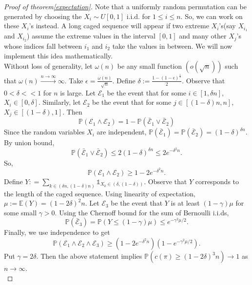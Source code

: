 \documentclass[10pt,a4paper]{amsart}
\begin{document}
\begin{proof}[Proof of theorem\ref{expectation}]
 Note that a uniformly random permutation can be generated by choosing the $X_i \sim U[0,1]$ i.i.d. for $1 \leq i \leq n$. So, we can work on these $X_i$'s instead. A long caged sequence will appear if two extreme $X_i$'s(say $X_{i_1}$ and $X_{i_2} $) assume the extreme values in the interval $[0, 1]$ and many other $X_j$'s whose indices fall between $i_1$ and $i_2$ take the values in between. We will now implement this idea mathematically. \\
 Without loss of generality, let $\omega(n)$ be any small function $\left(o(\sqrt{n})\right)$ such that $\omega(n) \xrightarrow{n \rightarrow \infty } \infty$. Take $\displaystyle\epsilon = \frac{\omega(n)}{\sqrt{n}}$. Define $\delta := \displaystyle \frac{1 - (1 - \epsilon)^{\frac{1}{3}}}{2} $. Observe that $0<\delta < < 1$ for $n$ is large. Let $\mathcal{E}_1 $ be the event that for some $i \in [1, \delta n]$, $X_i \in [0, \delta ]$. Similarly, let $\mathcal{E}_2 $ be the event that for some $j \in [(1 -\delta) n, n]$, $X_j \in [(1 - \delta), 1]$. Then 
 \[
 \mathbb{P}\left( \mathcal{E}_1 \wedge \mathcal{E}_2 \right) = 1 - \mathbb{P}\left( \bar{\mathcal{E}}_1 \vee \bar{\mathcal{E}}_2 \right)
 \] 
 Since the random variables $X_i$ are independent, $ \mathbb{P}\left( \bar{\mathcal{E}}_1 \right) = \mathbb{P} \left( \bar{\mathcal{E}}_2 \right) = (1 - \delta )^{\delta n} $. By union bound,
 \[
 \mathbb{P}\left( \bar{\mathcal{E}}_1 \vee \bar{\mathcal{E}}_2 \right) \leq 2(1 - \delta )^{\delta n} \leq 2e^{-\delta^2 n}.
 \] 
 So, 
 \[
 \mathbb{P}\left( \mathcal{E}_1 \wedge \mathcal{E}_2 \right) \geq 1 -  2e^{-\delta^2 n}.
 \]
 Define $Y : = \displaystyle \sum_{k \in (\delta n, (1 - \delta)n)} \displaystyle  \mathbb{1}_{X_k \in (\delta , (1- \delta ))} $. Observe that $Y$ corresponds to the length of the caged sequence. Using linearity of expectation, $\mu := \mathbb{E}( Y) = (1 - 2\delta)^2 n$. 
 Let $\mathcal{E}_3$ be the event that $Y$ is at least $(1 - \gamma) \mu$ for some small $\gamma >0$. Using the Chernoff bound for the sum of Bernoulli i.i.ds,
 \[
 \mathbb{P}\left( \bar{\mathcal{E}}_3 \right) = \mathbb{P}\left( Y \leq (1 - \gamma)\mu  \right) \leq \displaystyle e^{-\gamma^2 \mu / 2}.
 \]
 Finally, we use independence to get  
 \[
 \mathbb{P}\left( \mathcal{E}_1 \wedge \mathcal{E}_2 \wedge \mathcal{E}_3  \right) \geq \left( 1 -  2e^{-\delta^2 n} \right) \left( 1 - e^{-\gamma^2 \mu / 2} \right).
 \]
 Put $\gamma = 2 \delta$. Then the above statement implies $ \mathbb{P}\left(c(\pi) \geq (1 - 2 \delta)^3 n \right) \longrightarrow 1$ as $ n \rightarrow \infty$. \\

\end{proof}
\end{document}

